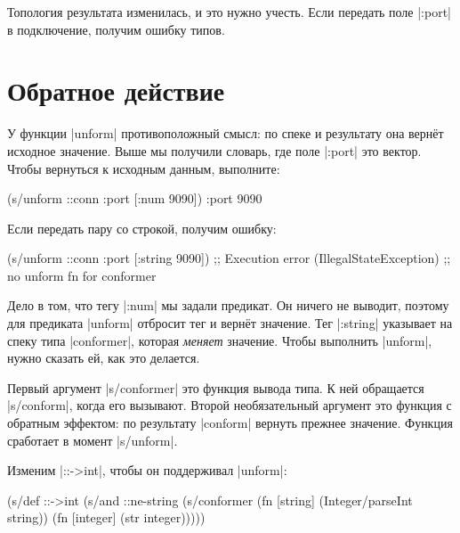 Топология результата изменилась, и это нужно учесть. Если передать поле
\spverb|:port| в подключение, получим ошибку типов.

\section{Обратное действие}


У функции \spverb|unform| противоположный смысл: по спеке и результату она
верн\"{е}т исходное значение. Выше мы получили словарь, где поле \spverb|:port| это
вектор. Чтобы вернуться к исходным данным, выполните:

\begin{english}
  \begin{clojure}
(s/unform ::conn {:port [:num 9090]})
{:port 9090}
  \end{clojure}
\end{english}

\noindent
Если передать пару со строкой, получим ошибку:

\begin{english}
  \begin{clojure}
(s/unform ::conn {:port [:string 9090]})
;; Execution error (IllegalStateException)
;; no unform fn for conformer
  \end{clojure}
\end{english}

Дело в том, что тегу \spverb|:num| мы задали предикат. Он ничего не выводит,
поэтому для предиката \spverb|unform| отбросит тег и верн\"{е}т значение. Тег
\spverb|:string| указывает на спеку типа \spverb|conformer|, которая
\emph{меняет} значение. Чтобы выполнить \spverb|unform|, нужно сказать ей, как
это делается.


Первый аргумент \spverb|s/conformer| это функция вывода типа. К ней обращается
\spverb|s/conform|, когда его вызывают. Второй необязательный аргумент это
функция с обратным эффектом: по результату \spverb|conform| вернуть прежнее
значение. Функция сработает в момент \spverb|s/unform|.

Изменим \spverb|::->int|, чтобы он поддерживал \spverb|unform|:

\begin{english}
  \begin{clojure}
(s/def ::->int
  (s/and
   ::ne-string
   (s/conformer
    (fn [string]
      (Integer/parseInt string))
    (fn [integer]
      (str integer)))))
  \end{clojure}
\end{english}

